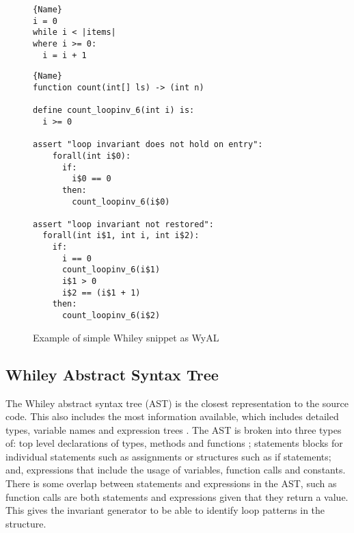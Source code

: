 \begin{figure}
\noindent\begin{minipage}{.45\textwidth}
\begin{lstlisting}[caption={Whiley Code},frame=tlrb,numbers=none]{Name}
i = 0
while i < |items|
where i >= 0:
  i = i + 1
\end{lstlisting}
\end{minipage}\hfill
\begin{minipage}{.45\textwidth}
\begin{lstlisting}[caption={WyAL Code},frame=tlrb,numbers=none,breaklines=true]{Name}
function count(int[] ls) -> (int n)

define count_loopinv_6(int i) is:
  i >= 0
      
assert "loop invariant does not hold on entry":
    forall(int i$0):
      if:
        i$0 == 0
      then:
        count_loopinv_6(i$0)

assert "loop invariant not restored":
  forall(int i$1, int i, int i$2):
    if:
      i == 0
      count_loopinv_6(i$1)
      i$1 > 0
      i$2 == (i$1 + 1)
    then:
      count_loopinv_6(i$2)
\end{lstlisting}
\end{minipage}
\caption{Example of simple Whiley snippet as WyAL}
\label{lst:design-wyal}
\end{figure}

\subsection{Whiley Abstract Syntax Tree}

The Whiley abstract syntax tree (AST) is the closest representation to
the source code.
This also includes the most information available, which includes detailed
types, variable names and expression trees \cite{whiley-origin}.
The AST is broken into three types of: top level declarations of types,
methods and functions ; statements blocks for individual statements
such as assignments or structures such as if statements; and, expressions
that include the usage of variables, function calls and constants.
There is some overlap between statements and expressions in the AST,
such as function calls are both statements and expressions given that they
return a value.
This gives the invariant generator to be able to identify loop patterns in the
structure.

